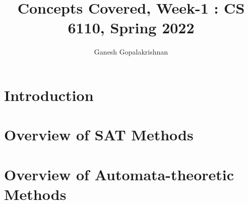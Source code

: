 \documentclass[conference]{IEEEtran}
\begin{document}
\title{Concepts Covered, Week-1 : CS 6110, Spring 2022} 
 




\author{Ganesh Gopalakrishnan}



\maketitle

\begin{abstract}

\end{abstract}

\section{Introduction}
\label{sec:intro}
 

\section{Overview of SAT Methods}
\label{sec:sat}


\section{Overview of Automata-theoretic Methods}
\label{sec:aut}

\end{document}
